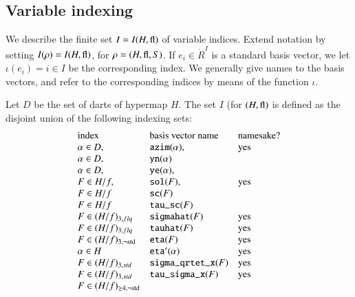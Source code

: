 \subsection{Variable indexing}
\label{sec:var-index}

We describe the finite set $I = I(H,{\operatorname{fl}})$ of variable indices.
Extend notation by setting $I(\rho) = I(H,{\operatorname{fl}})$, for $\rho =
(H,{\operatorname{fl}},S)$.  If $e_i\in \ring{R}^I$ is a standard basis
vector, we let $\iota(e_i)=i\in I$ be the corresponding index.  We
generally give names to the basis vectors, and refer to the
corresponding indices by means of the function $\iota$.





\begin{definition}
Let $D$ be the set of darts of hypermap $H$.  The set $I$ (for
$(H,\op{fl})$ is defined as the disjoint union of the following
indexing sets:
    $$\begin{array}{llll}
        \text{index} &\text{basis vector name}&\text{namesake?}
        \\
        \alpha\in D, &\optt{azim}(\alpha), &\text{yes}
        \\
        \alpha\in D, &\optt{yn} (\alpha)
        \\
        \alpha\in D,
        &\optt{ye} (\alpha),
        \\
        F\in H/f,
        &\optt{sol} (F), &\text{yes}
        \\
        F\in H/f
        &\optt{sc} (F)
        \\
        F\in H/f
        &{\optt{tau\_sc}} (F)
        &\text{ }\\
        F\in (H/f)_{3,flq}
        &\optt{sigmahat} (F)
        &  \text{yes}\\
        F\in (H/f)_{3,flq}
        &\optt{tauhat} (F)
        &\text{yes}\\
        F\in (H/f)_{3,\neg\op{std}}
        &\optt{eta}(F)
        &\text{yes}\\
        \alpha\in H
        &\optt{eta}'(\alpha)
        &\text{yes}\\
        F\in (H/f)_{3,std}
        &\optt{sigma\_qrtet\_x} (F)
        &\text{yes} \\
        F\in (H/f)_{3,std}
        &\optt{tau\_sigma\_x} (F)
        &\text{yes} \\
        F\in (H/f)_{\ge4,\neg\op{std}}

\end{array}$$
\end{definition}
